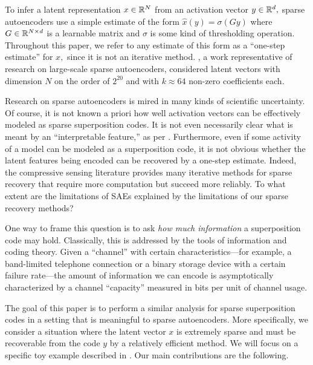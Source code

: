 To infer a latent representation $x \in \mathbb{R}^N$ from an activation vector $y \in \mathbb{R}^d,$ sparse autoencoders use a simple estimate of the form $\hat x(y) = \sigma(G y)$ where $G \in \mathbb{R}^{N \times d}$ is a learnable matrix and $\sigma$ is some kind of thresholding operation. Throughout this paper, we refer to any estimate of this form as a ``one-step estimate'' for $x,$ since it is not an iterative method. \citet{gao_scaling_2024}, a work representative of research on large-scale sparse autoencoders, considered latent vectors with dimension $N$ on the order of $2^{20}$ and with $k \approx 64$ non-zero coefficients each.

Research on sparse autoencoders is mired in many kinds of scientific uncertainty. Of course, it is not known a priori how well activation vectors can be effectively modeled as sparse superposition codes. It is not even necessarily clear what is meant by an ``interpretable feature,'' as per \citet{zytek_need_2022}. Furthermore, even if some activity of a model can be modeled as a superposition code, it is not obvious whether the latent features being encoded can be recovered by a one-step estimate. Indeed, the compressive sensing literature provides many iterative methods for sparse recovery that require more computation but succeed more reliably. To what extent are the limitations of SAEs explained by the limitations of our sparse recovery methods?

One way to frame this question is to ask \textit{how much information} a superposition code may hold. Classically, this is addressed by the tools of information and coding theory. Given a ``channel'' with certain characteristics---for example, a band-limited telephone connection or a binary storage device with a certain failure rate---the amount of information we can encode is asymptotically characterized by a channel ``capacity'' measured in bits per unit of channel usage.

The goal of this paper is to perform a similar analysis for sparse superposition codes in a setting that is meaningful to sparse autoencoders. More specifically, we consider a situation where the latent vector $x$ is extremely sparse and must be recoverable from the code $y$ by a relatively efficient method. We will focus on a specific toy example described in . Our main contributions are the following.

